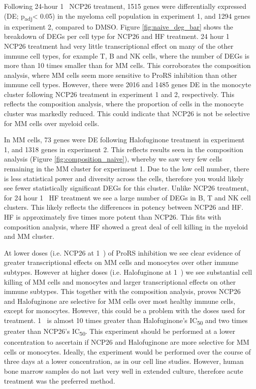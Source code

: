 Following 24-hour 1\si{\micro\Molar} NCP26 treatment, 1515 genes were differentially expressed (DE; p\textsubscript{adj}< 0.05) in the myeloma cell population in experiment 1, and 1294 genes in experiment 2, compared to DMSO\@.
Figure \ref{fig:naive_deg_bar} shows the breakdown of DEGs per cell type for NCP26 and HF treatment.
24 hour 1\si{\micro\Molar} NCP26 treatment had very little transcriptional effect on many of the other immune cell types, for example T, B and NK cells, where the number of DEGs is more than 10 times smaller than for MM cells.
This corroborates the composition analysis, where MM cells seem more sensitive to ProRS inhibition than other immune cell types.
However, there were 2016 and 1485 genes DE in the monocyte cluster following NCP26 treatment in experiment 1 and 2, respectively.
This reflects the composition analysis, where the proportion of cells in the monocyte cluster was markedly reduced.
This could indicate that NCP26 is not be selective for MM cells over myeloid cells.

In MM cells, 73 genes were DE following Halofuginone treatment in experiment 1, and 1318 genes in experiment 2.
This reflects results seen in the composition analysis (Figure \ref{fig:composition_naive}), whereby we saw very few cells remaining in the MM cluster for experiment 1.
Due to the low cell number, there is less statistical power and diversity across the cells, therefore you would likely see fewer statistically significant DEGs for this cluster.
Unlike NCP26 treatment, for 24 hour 1\si{\micro\Molar} HF treatment we see a large number of DEGs in B, T and NK cell clusters.
This likely reflects the differences in potency between NCP26 and HF\@.
HF is approximately five times more potent than NCP26.
This fits with composition analysis, where HF showed a great deal of cell killing in the myeloid and MM cluster.

At lower doses (i.e. NCP26 at 1\si{\micro\Molar}) of ProRS inhibition we see clear evidence of greater transcriptional effects on MM cells and monocytes over other immune subtypes.
However at higher doses (i.e. Halofuginone at 1\si{\micro\Molar}) we see substantial cell killing of MM cells and monocytes and larger transcriptional effects on other immune subtypes.
This together with the composition analysis, proves NCP26 and Halofuginone are selective for MM cells over most healthy immune cells, except for monocytes.
However, this could be a problem with the doses used for treatment.
1\si{\micro\Molar} is almost 10 times greater than Halofuginone's IC\textsubscript{50} and two times greater than NCP26's IC\textsubscript{50}.
This experiment should be performed at a lower concentration to ascertain if NCP26 and Halofuginone are more selective for MM cells or monocytes.
Ideally, the experiment would be performed over the course of three days at a lower concentration, as in our cell line studies.
However, human bone marrow samples do not last very well in extended culture, therefore acute treatment was the preferred method.


